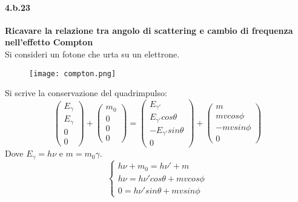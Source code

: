 \documentclass[twoside]{article}
\begin{document}
\paragraph{4.b.23}\textbf{Ricavare la relazione tra angolo di scattering e cambio di frequenza nell'effetto
Compton} \\



Si consideri un fotone che urta su un elettrone. \\

\begin{figure}[H]
    \centering
    \texttt{[image: compton.png]}

\end{figure}
Si scrive la conservazione del quadrimpulso:
\begin{equation}
    \left( 
    \begin{array}{lr}
         E_\gamma  \\
         E_\gamma \\
         0 \\
         0
    \end{array}
    \right) + \left(     \begin{array}{lr}
         m_0  \\
         0 \\
         0 \\
         0
    \end{array}
    \right) = \left( 
        \begin{array}{lr}
         E_{\gamma'}  \\
         E_{\gamma'}cos \theta \\
        - E_{\gamma'} sin\theta\\
         0 
    \end{array}
    \right) + \left(
        \begin{array}{lr}
         m  \\
         mvcos\phi \\
        - mvsin \phi\\
         0
    \end{array}
    \right)
\end{equation}
Dove $E_\gamma=h\nu$ e $m=m_0 \gamma$.
\begin{equation}
    \left\{ 
    \begin{array}{lr}
         h\nu + m_0=h\nu'+m  \\
         h\nu=h\nu'cos\theta+mvcos\phi \\
         0=h\nu'sin\theta+mvsin\phi
    \end{array}
    \right.
\end{equation}
\end{document}
